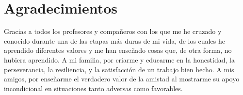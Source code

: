 \chapter{Agradecimientos}
Gracias a todos los profesores y compañeros con los que me he cruzado y conocido durante una de las etapas más duras de mi vida, de los cuales he aprendido diferentes valores y me han enseñado cosas que, de otra forma, no hubiera aprendido. A mi familia, por criarme y educarme en la honestidad, la perseverancia, la resiliencia, y la satisfacción de un trabajo bien hecho. A mis amigos, por enseñarme el verdadero valor de la amistad al mostrarme su apoyo incondicional en situaciones tanto adversas como favorables.

\newpage
\thispagestyle{empty}
\hspace*{0.5cm}
\newpage